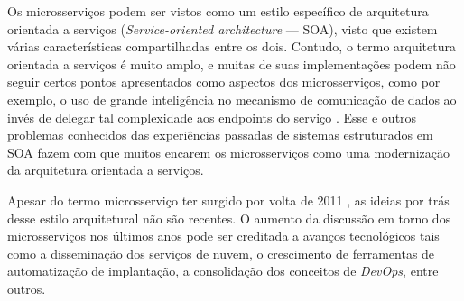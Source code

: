 Os microsserviços podem ser vistos como um estilo específico de arquitetura orientada a serviços (\textit{Service-oriented architecture} --- SOA), visto que existem várias características compartilhadas entre os dois. Contudo, o termo arquitetura orientada a serviços é muito amplo, e muitas de suas implementações podem não seguir certos pontos apresentados como aspectos dos microsserviços, como por exemplo, o uso de grande inteligência no mecanismo de comunicação de dados ao invés de delegar tal complexidade aos endpoints do serviço \cite{james}. Esse e outros problemas conhecidos das experiências passadas de sistemas estruturados em SOA fazem com que muitos encarem os microsserviços como uma modernização da arquitetura orientada a serviços.

Apesar do termo microsserviço ter surgido por volta de 2011 \cite{james}, as ideias por trás desse estilo arquitetural não são recentes. O aumento da discussão em torno dos microsserviços nos últimos anos pode ser creditada a avanços tecnológicos tais como a disseminação dos serviços de nuvem, o crescimento de ferramentas de automatização de implantação, a consolidação dos conceitos de \emph{DevOps}, entre outros.

